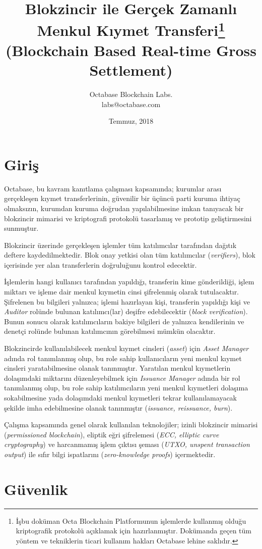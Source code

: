 \documentclass[a4paper,11pt]{article}
\title{\textbf{Blokzincir ile Gerçek Zamanlı\\
 Menkul Kıymet Transferi\footnote{İşbu doküman Octa Blockchain Platformunun işlemlerde kullanmış olduğu kriptografik protokolü açıklamak için hazırlanmıştır. Dokümanda geçen tüm yöntem ve tekniklerin ticari kullanım hakları Octabase lehine saklıdır.}}\\ {\normalsize (Blockchain Based Real-time Gross Settlement)}}
\author{Octabase Blockchain Labs.\\
		labs@octabase.com}
\date{Temmuz, 2018}
\begin{document}
\maketitle

\section{Giriş}
Octabase, bu kavram kanıtlama çalışması kapsamında; kurumlar arası gerçekleşen kıymet transferlerinin, güvenilir bir üçüncü parti kuruma ihtiyaç olmaksızın, kurumdan kuruma doğrudan yapılabilmesine imkan tanıyacak bir blokzincir mimarisi ve kriptografi protokolü tasarlamış ve prototip geliştirmesini sunmuştur.

Blokzincir üzerinde gerçekleşen işlemler tüm katılımcılar tarafından dağıtık deftere kaydedilmektedir. Blok onay yetkisi olan tüm katılımcılar (\emph{verifiers}), blok içerisinde yer alan transferlerin doğruluğunu kontrol edecektir.

İşlemlerin hangi kullanıcı tarafından yapıldığı, transferin kime gönderildiği, işlem miktarı ve işleme dair menkul kıymetin cinsi şifrelenmiş olarak tutulacaktır. Şifrelenen bu bilgileri yalnızca; işlemi hazırlayan kişi, transferin yapıldığı kişi ve \emph{Auditor} rolünde bulunan katılımcı(lar) deşifre edebilecektir (\emph{block verification}). Bunun sonucu olarak katılımcıların bakiye bilgileri de yalnızca kendilerinin ve denetçi rolünde bulunan katılımcının görebilmesi mümkün olacaktır.

Blokzincirde kullanılabilecek menkul kıymet cinsleri (\emph{asset}) için \emph{Asset Manager} adında rol tanımlanmış olup, bu role sahip kullanıcıların yeni menkul kıymet cinsleri yaratabilmesine olanak tanınmıştır. Yaratılan menkul kıymetlerin dolaşımdaki miktarını düzenleyebilmek için \emph{Issuance Manager} adında bir rol tanımlanmış olup, bu role sahip katılımcıların yeni menkul kıymetleri dolaşıma sokabilmesine yada dolaşımdaki menkul kıymetleri tekrar kullanılamayacak şekilde imha edebilmesine olanak tanınmıştır (\emph{issuance, reissuance, burn}).

Çalışma kapsamında genel olarak kullanılan teknolojiler; izinli blokzincir mimarisi (\emph{permissioned blockchain}), eliptik eğri şifrelemesi (\emph{ECC, elliptic curve cryptography}) ve harcanmamış işlem çıktısı şeması (\emph{UTXO, unspent transaction output}) ile sıfır bilgi ispatlarını (\emph{zero-knowledge proofs}) içermektedir.


\section{Güvenlik}
\end{document}

